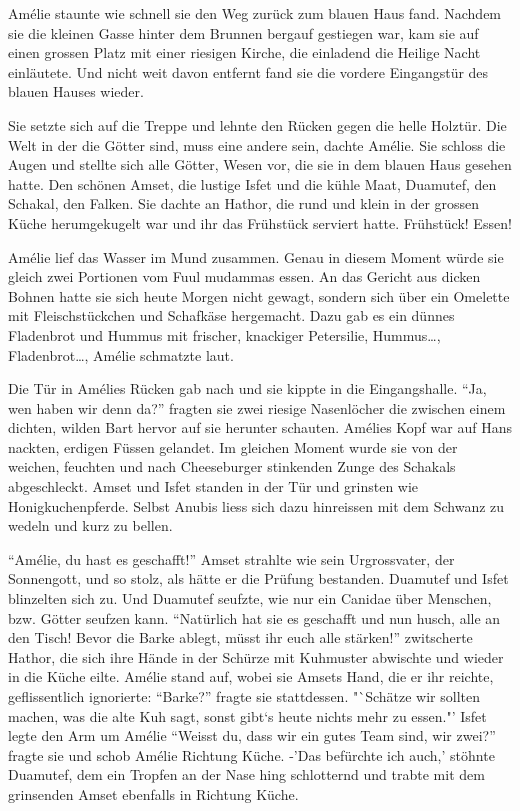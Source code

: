 \documentclass[11pt,titlepage,a5paper]{book}
\begin{document}
Amélie staunte wie schnell sie den Weg zurück zum blauen Haus fand. Nachdem sie die kleinen Gasse hinter dem Brunnen bergauf gestiegen war, kam sie auf einen grossen Platz mit einer riesigen Kirche, die einladend die Heilige Nacht einläutete. Und nicht weit davon entfernt fand sie die vordere Eingangstür des blauen Hauses wieder.

Sie setzte sich auf die Treppe und lehnte den Rücken gegen die helle Holztür. Die Welt in der die Götter sind, muss eine andere sein, dachte Amélie. Sie schloss die Augen und stellte sich alle Götter, Wesen vor, die sie in dem blauen Haus gesehen hatte. Den schönen Amset, die lustige Isfet und die kühle Maat, Duamutef, den Schakal, den Falken. Sie dachte an Hathor, die rund und klein in der grossen Küche herumgekugelt war und ihr das Frühstück serviert hatte. Frühstück! Essen!

Amélie lief das Wasser im Mund zusammen. Genau in diesem Moment würde sie gleich zwei Portionen vom Fuul mudammas essen. An das Gericht aus dicken Bohnen hatte sie sich heute Morgen nicht gewagt, sondern sich über ein Omelette mit Fleischstückchen und Schafkäse hergemacht. Dazu gab es ein dünnes Fladenbrot und Hummus mit frischer, knackiger Petersilie, Hummus\dots, Fladenbrot\dots, Amélie schmatzte laut. 

Die Tür in Amélies Rücken gab nach und sie kippte in die Eingangshalle. "`Ja, wen haben wir denn da?"' fragten sie zwei riesige Nasenlöcher die zwischen einem dichten, wilden Bart hervor auf sie herunter schauten. Amélies Kopf war auf Hans nackten, erdigen Füssen gelandet. Im gleichen Moment wurde sie von der weichen, feuchten und nach Cheeseburger stinkenden Zunge des Schakals abgeschleckt. Amset und Isfet standen in der Tür und grinsten wie Honigkuchenpferde. Selbst Anubis liess sich dazu hinreissen mit dem Schwanz zu wedeln und kurz zu bellen.

"`Amélie, du hast es geschafft!"' Amset strahlte wie sein Urgrossvater, der Sonnengott, und so stolz, als hätte er die Prüfung bestanden. Duamutef und Isfet blinzelten sich zu. Und Duamutef seufzte, wie nur ein Canidae über Menschen, bzw. Götter seufzen kann. "`Natürlich hat sie es geschafft und nun husch, alle an den Tisch! Bevor die Barke ablegt, müsst ihr euch alle stärken!"' zwitscherte Hathor, die sich ihre Hände in der Schürze mit Kuhmuster abwischte und wieder in die Küche eilte. Amélie stand auf, wobei sie Amsets Hand, die er ihr reichte, geflissentlich ignorierte: "`Barke?"' fragte sie stattdessen. "`Schätze wir sollten machen, was die alte Kuh sagt, sonst gibt`s heute nichts mehr zu essen."' Isfet legte den Arm um Amélie "`Weisst du, dass wir ein gutes Team sind, wir zwei?"' fragte sie und schob Amélie Richtung Küche. -'Das befürchte ich auch,' stöhnte Duamutef, dem ein Tropfen an der Nase hing schlotternd und trabte mit dem grinsenden Amset ebenfalls in Richtung Küche.
\end{document}
